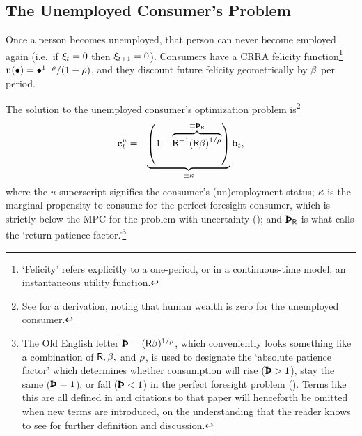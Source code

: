 \documentclass{handout}
\begin{document}
\pagebreak 
\subsection{The Unemployed Consumer's Problem} \label{subsec:Fred}

Once a person becomes unemployed, that person can never become
employed again (i.e.\ if $\xi_{t}=0$ then $\xi_{t+1}=0$).
Consumers have a CRRA felicity function\footnote{`Felicity' refers
  explicitly to a one-period, or in a continuous-time model, an
  instantaneous utility function.}
${\mathrm{u}}(\bullet)= \bullet^{1-\rho}/(1-\rho)$, and they discount
future felicity geometrically by $\beta$ per period.


\renewcommand{\MPCU}{\MPC} %
The solution to the unemployed consumer's optimization problem
is\footnote{See  for a derivation, noting that human wealth is zero for the unemployed consumer.} 
\begin{eqnarray}
        \cLevBF^{u}_{t} & = & \underbrace{\left(1-\overbrace{\Rfree ^{-1}(\Rfree{\Discount})^{1/\CRRA}}^{\equiv \PatR}\right)}_{\equiv \MPCU} \bLevBF_{t} \label{eq:cpfinfhorunemp} \label{eq:cdel} \label{eq:kappaDef} \label{eq:PatR}
,
\end{eqnarray}
where the $u$ superscript signifies the consumer's (un)employment
status; $\MPCU$ is the marginal propensity to consume for the perfect
foresight consumer, which is strictly below the MPC for the problem
with uncertainty (\cite{carroll&kimball:concavity}); and $\PatR$ is
what \cite{carrollBSTheory} calls the `return patience factor.'\footnote{The Old English letter $\Pat = (\Rfree \Discount)^{1/\CRRA}$, which conveniently looks something like a combination of $\mathsf{R}, \beta, $ and $\rho$, is used to designate the `absolute patience factor' which determines whether consumption will rise ($\Pat > 1$), stay the same ($\Pat = 1$), or fall ($\Pat < 1$) in the perfect foresight problem ().  Terms like this are all defined in \cite{carrollBSTheory} and citations to that paper will henceforth be omitted when new terms are introduced, on the understanding that the reader knows to see \cite{carrollBSTheory} for further definition and discussion.}
\end{document}
